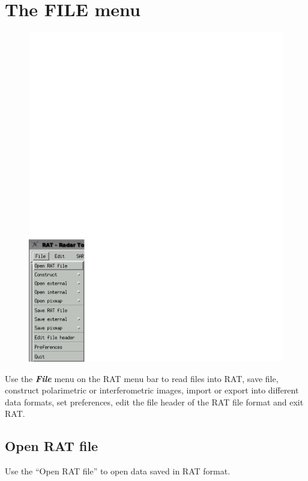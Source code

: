 \chapter{The FILE menu}
\begin{figure}[!htbp]
   \centering
   \includegraphics[scale=0.8]{images/pdf/file_menu.pdf}
\end{figure}

Use the \textbf{\textit{File}}  menu on the RAT menu bar to read files into RAT, save file, construct polarimetric or interferometric images, import or export into different data formats, set preferences, edit the file header of the RAT file format and exit RAT.

\newpage 
\section{Open RAT file}
Use the ``Open RAT file'' to open data saved in RAT format.

